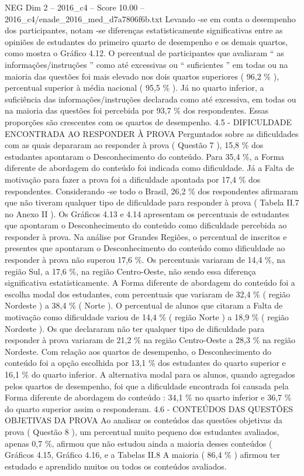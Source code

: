 \begin{textsample}{NEG Dim 2 – 2016\_c4 – Score 10.00 – 2016\_c4/enade\_2016\_med\_d7a7806f6b.txt}
Levando -se em conta o desempenho dos participantes, notam -se diferenças estatisticamente significativas entre as opiniões de estudantes do primeiro quarto de desempenho e os demais quartos, como mostra o Gráfico 4.12.
O percentual de participantes que avaliaram “ as informações/instruções ” como até excessivas ou “ suficientes ” em todas ou na maioria das questões foi mais elevado nos dois quartos superiores ( 96,2 \% ), percentual superior à média nacional ( 95,5 \% ).
Já no quarto inferior, a suficiência das informações/instruções declarada como até excessiva, em todas ou na maioria das questões foi percebida por 93,7 \% dos respondentes.
Essas proporções são crescentes com os quartos de desempenho. 4.5 - DIFICULDADE ENCONTRADA AO RESPONDER À PROVA Perguntados sobre as dificuldades com as quais depararam ao responder à prova ( Questão 7 ), 15,8 \% dos estudantes apontaram o Desconhecimento do conteúdo.
Para 35,4 \%, a Forma diferente de abordagem do conteúdo foi indicada como dificuldade.
Já a Falta de motivação para fazer a prova foi a dificuldade apontada por 17,4 \% dos respondentes.
Considerando -se todo o Brasil, 26,2 \% dos respondentes afirmaram que não tiveram qualquer tipo de dificuldade para responder à prova ( Tabela II.7 no Anexo II ).
Os Gráficos 4.13 e 4.14 apresentam os percentuais de estudantes que apontaram o Desconhecimento do conteúdo como dificuldade percebida ao responder à prova.
Na análise por Grandes Regiões, o percentual de inscritos e presentes que apontaram o Desconhecimento do conteúdo como dificuldade ao responder à prova não superou 17,6 \%.
Os percentuais variaram de 14,4 \%, na região Sul, a 17,6 \%, na região Centro-Oeste, não sendo essa diferença significativa estatisticamente.
A Forma diferente de abordagem do conteúdo foi a escolha modal dos estudantes, com percentuais que variaram de 32,4 \% ( região Nordeste ) a 38,4 \% ( Norte ).
O percentual de alunos que citaram a Falta de motivação como dificuldade variou de 14,4 \% ( região Norte ) a 18,9 \% ( região Nordeste ).
Os que declararam não ter qualquer tipo de dificuldade para responder à prova variaram de 21,2 \% na região Centro-Oeste a 28,3 \% na região Nordeste.
Com relação aos quartos de desempenho, o Desconhecimento do conteúdo foi a opção escolhida por 13,1 \% dos estudantes do quarto superior e 16,1 \% do quarto inferior.
A alternativa modal para os alunos, quando agregados pelos quartos de desempenho, foi que a dificuldade encontrada foi causada pela Forma diferente de abordagem do conteúdo : 34,1 \% no quarto inferior e 36,7 \% do quarto superior assim o responderam. 4.6 - CONTEÚDOS DAS QUESTÕES OBJETIVAS DA PROVA Ao analisar os conteúdos das questões objetivas da prova ( Questão 8 ), um percentual muito pequeno dos estudantes avaliados, apenas 0,7 \%, afirmou que não estudou ainda a maioria desses conteúdos ( Gráficos 4.15, Gráfico 4.16, e a Tabelas II.8 A maioria ( 86,4 \% ) afirmou ter estudado e aprendido muitos ou todos os conteúdos avaliados.

\end{textsample}

